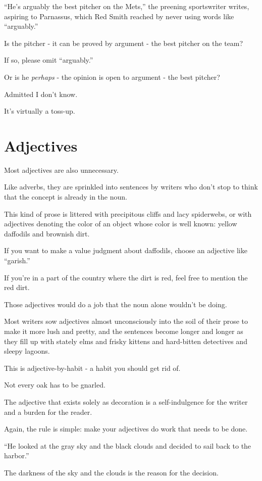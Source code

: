 \documentclass{book}
\numberwithin{equation}{section}
\begin{document}
``He's arguably the best pitcher on the Mets,'' the preening sportswriter writes, aspiring to Parnassus, which Red Smith reached by never using words like ``arguably.''

Is the pitcher - it can be proved by argument - the best pitcher on the team?

If so, please omit ``arguably.''

Or is he \textit{perhaps} - the opinion is open to argument - the best pitcher?

Admitted I don't know.

It's virtually a toss-up.

\section{Adjectives}
Most adjectives are also unnecessary.

Like adverbs, they are sprinkled into sentences by writers who don't stop to think that the concept is already in the noun.

This kind of prose is littered with precipitous cliffs and lacy spiderwebs, or with adjectives denoting the color of an object whose color is well known: yellow daffodils and brownish dirt.

If you want to make a value judgment about daffodils, choose an adjective like ``garish.''

If you're in a part of the country where the dirt is red, feel free to mention the red dirt.

Those adjectives would do a job that the noun alone wouldn't be doing.

%
Most writers sow adjectives almost unconsciously into the soil of their prose to make it more lush and pretty, and the sentences become longer and longer as they fill up with stately elms and frisky kittens and hard-bitten detectives and sleepy lagoons.

This is adjective-by-habit - a habit you should get rid of.

Not every oak has to be gnarled.

The adjective that exists solely as decoration is a self-indulgence for the writer and a burden for the reader.

%
Again, the rule is simple: make your adjectives do work that needs to be done.

``He looked at the gray sky and the black clouds and decided to sail back to the harbor.''

The darkness of the sky and the clouds is the reason for the decision.
\end{document}
